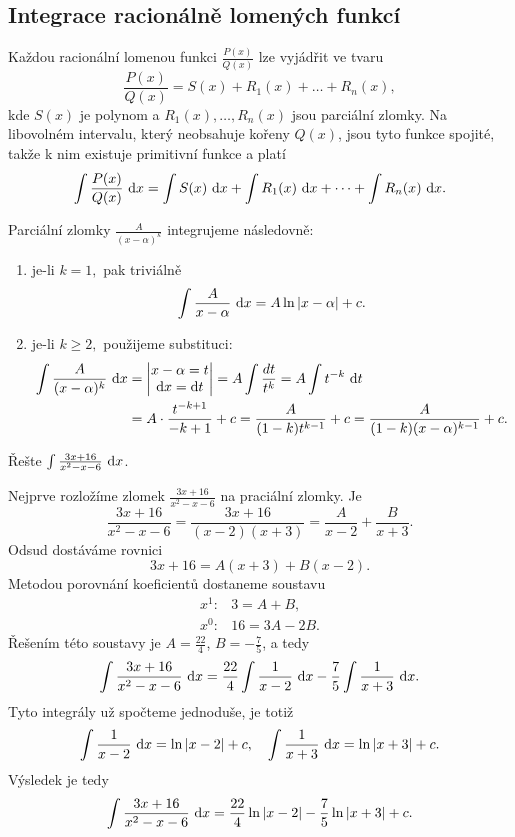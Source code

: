 \subsection*{Integrace racionálně lomených funkcí}
\begin{pozn}
    Každou racionální lomenou funkci $\frac{P(x)}{Q(x)}$ lze vyjádřit ve tvaru
    $$\frac{P(x)}{Q(x)}=S(x)+R_1(x)+\dots+R_n(x),$$
    kde $S(x)$ je polynom a $R_1(x),\dots,R_n(x)$ jsou parciální zlomky.
    Na libovolném intervalu, který neobsahuje kořeny $Q(x)$, jsou tyto funkce spojité,
    takže k nim existuje primitivní funkce a platí
    $$\int \frac{P(x)}{Q(x)} \, \mathop{}\!\mathrm{d} x=\int S(x)\, \mathop{}\!\mathrm{d} x + \int R_1(x)\, \mathop{}\!\mathrm{d} x + \dots + \int R_n(x)\, \mathop{}\!\mathrm{d} x.$$
\end{pozn}

\begin{pozn}
    Parciální zlomky $\frac{A}{(x-\alpha)^k}$ integrujeme následovně:
    \begin{enumerate}[$i.$]
    \item je-li $k=1,$ pak triviálně
    $$\int \frac{A}{x-\alpha} \, \mathop{}\!\mathrm{d} x = A\operatorname{ln} |x-\alpha|+c.$$
   	\item je-li $k\geq 2,$ použijeme substituci:
    \begin{align*}
    \int \frac{A}{(x-\alpha)^k}\, \mathop{}\!\mathrm{d} x &=\begin{vmatrix}
      x-\alpha=t \\
      \mathop{}\!\mathrm{d} x = \mathop{}\!\mathrm{d} t
  \end{vmatrix}=A\int \frac{dt}{t^k}=A\int t^{-k}\, \mathop{}\!\mathrm{d} t \\
 & = A\cdot \frac{t^{-k+1}}{-k+1}+c=\frac{A}{(1-k)t^{k-1}}+c=\frac{A}{(1-k)(x-\alpha)^{k-1}}+c.
    \end{align*}
    \end{enumerate}
\end{pozn}

\begin{priklad}
Řešte $\int \frac{3x+16}{x^2-x-6}\, \mathop{}\!\mathrm{d} x$.
\end{priklad}

\begin{reseni}
Nejprve rozložíme zlomek $\frac{3x+16}{x^2-x-6}$ na praciální zlomky. Je
$$
    \frac{3x+16}{x^2-x-6} = \frac{3x + 16}{(x-2)(x+3)} = \frac{A }{x-2}+ \frac{B}{x+3}.
$$
Odsud dostáváme rovnici
$$
    3x + 16 = A(x+3) + B(x-2).
$$
Metodou porovnání koeficientů dostaneme soustavu
\begin{align*}
	x^1: & 3 = A+B, \\
	x^0: & 16 = 3A - 2B.
\end{align*}
Řešením této soustavy je $A = \frac{22}{4}$, $B = -\frac{7 }{5}$, a tedy
$$
    \int \frac{3x+16}{x^2-x-6}\, \mathop{}\!\mathrm{d} x = \frac{22}{4} \int \frac{1}{x-2} \, \mathop{}\!\mathrm{d} x -\frac{7 }{5} \int \frac{1}{x+3} \, \mathop{}\!\mathrm{d} x.
$$
Tyto integrály už spočteme jednoduše, je totiž
$$
    \int \frac{1}{x-2} \, \mathop{}\!\mathrm{d} x = \operatorname{ln} |x-2|+ c, \quad \int \frac{1}{x+3} \, \mathop{}\!\mathrm{d} x = \operatorname{ln} |x+ 3| + c.
$$
Výsledek je tedy
$$
    \int \frac{3x+16}{x^2-x-6}\, \mathop{}\!\mathrm{d} x = \frac{22}{4} \operatorname{ln} |x-2|-\frac{7 }{5}\operatorname{ln} |x+ 3|+c.
$$
\end{reseni}

